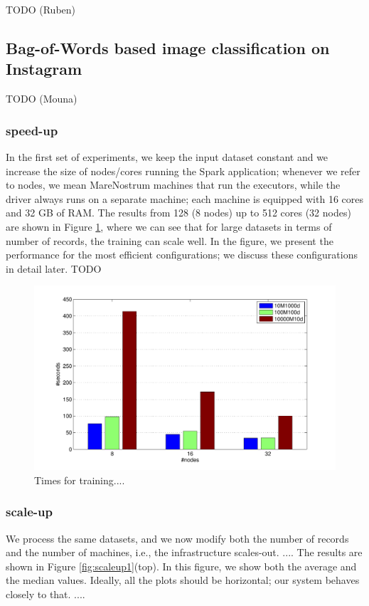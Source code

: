 \documentclass[smallextended]{svjour3}       %
\begin{document}
TODO (Ruben)

\subsection{Bag-of-Words based image classification on Instagram}

TODO (Mouna)

\subsubsection{speed-up} In the first set of experiments, we keep the input dataset constant and we increase the size of nodes/cores running the Spark application; whenever we refer to nodes, we mean  MareNostrum machines that run the executors, while the driver always runs on a separate machine; each machine is equipped with 16 cores and 32 GB of RAM. The results from 128 (8 nodes) up to 512 cores (32 nodes) are shown in Figure \ref{fig:speedup1}, where we can see that for large datasets in terms of number of records, the training can scale well. In the figure, we present the performance for the most efficient configurations; we discuss these configurations in detail later. TODO

\begin{figure}[tb!]
\begin{center}
\centerline{\includegraphics[width=0.75\linewidth]{img/speedup1.pdf}}
\caption{Times for training....}
\label{fig:speedup1}
\end{center}
\vspace{-0.5cm}
\end{figure}

\subsubsection{scale-up} We process the same datasets, and we now modify both the number of records and the number of machines, i.e., the infrastructure scales-out. .... The results are shown in Figure \ref{fig:scaleup1}(top). In this figure, we show both the average and the median values. Ideally, all the plots should be horizontal; our system behaves closely to that. ....
\end{document}
